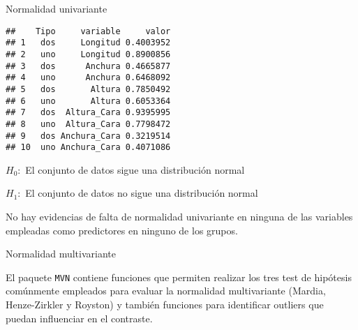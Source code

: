 \documentclass[ignorenonframetext,]{beamer}
\newenvironment{Shaded}{\begin{snugshade}}{\end{snugshade}}
\newcommand{\KeywordTok}[1]{\textcolor[rgb]{0.13,0.29,0.53}{\textbf{#1}}}
\newcommand{\DataTypeTok}[1]{\textcolor[rgb]{0.13,0.29,0.53}{#1}}
\newcommand{\StringTok}[1]{\textcolor[rgb]{0.31,0.60,0.02}{#1}}
\newcommand{\CommentTok}[1]{\textcolor[rgb]{0.56,0.35,0.01}{\textit{#1}}}
\newcommand{\ControlFlowTok}[1]{\textcolor[rgb]{0.13,0.29,0.53}{\textbf{#1}}}
\newcommand{\OperatorTok}[1]{\textcolor[rgb]{0.81,0.36,0.00}{\textbf{#1}}}
\newcommand{\NormalTok}[1]{#1}
\begin{document}
\begin{frame}[fragile]{Normalidad univariante}

\hypertarget{left}{}
\begin{verbatim}
##    Tipo     variable     valor
## 1   dos     Longitud 0.4003952
## 2   uno     Longitud 0.8900856
## 3   dos      Anchura 0.4665877
## 4   uno      Anchura 0.6468092
## 5   dos       Altura 0.7850492
## 6   uno       Altura 0.6053364
## 7   dos  Altura_Cara 0.9395995
## 8   uno  Altura_Cara 0.7798472
## 9   dos Anchura_Cara 0.3219514
## 10  uno Anchura_Cara 0.4071086
\end{verbatim}

\hypertarget{right}{}
\begin{Shaded}
\end{Shaded}

\(H_0:\) El conjunto de datos sigue una distribución normal

\(H_1:\) El conjunto de datos no sigue una distribución normal

No hay evidencias de falta de normalidad univariante en ninguna de las
variables empleadas como predictores en ninguno de los grupos.

\end{frame}

\begin{frame}[fragile]{Normalidad multivariante}

El paquete \texttt{MVN} contiene funciones que permiten realizar los
tres test de hipótesis comúnmente empleados para evaluar la normalidad
multivariante (Mardia, Henze-Zirkler y Royston) y también funciones para
identificar outliers que puedan influenciar en el contraste.

\end{frame}
\end{document}
